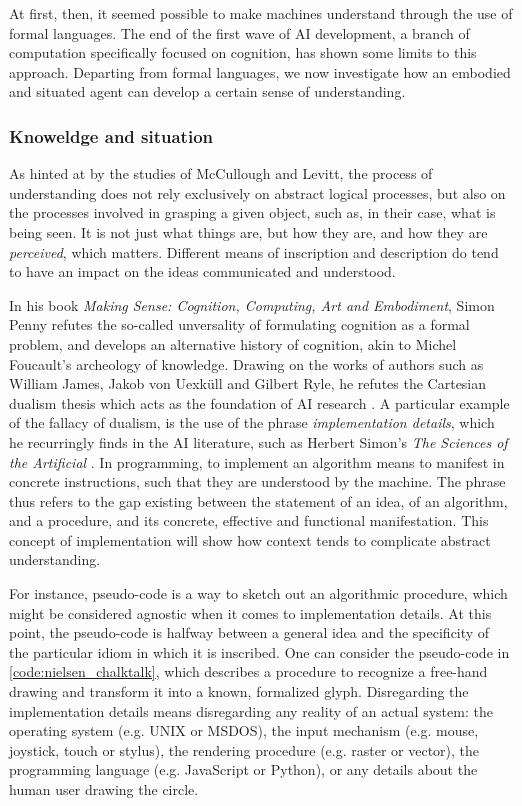 At first, then, it seemed possible to make machines understand through the use of formal languages. The end of the first wave of AI development, a branch of computation specifically focused on cognition, has shown some limits to this approach. Departing from formal languages, we now investigate how an embodied and situated agent can develop a certain sense of understanding.

\subsubsection{Knoweldge and situation}
\label{subsubsec:knowledge-situation}

As hinted at by the studies of McCullough and Levitt, the process of understanding does not rely exclusively on abstract logical processes, but also on the processes involved in grasping a given object, such as, in their case, what is being seen. It is not just what things are, but how they are, and how they are \emph{perceived}, which matters. Different means of inscription and description do tend to have an impact on the ideas communicated and understood.

In his book \emph{Making Sense: Cognition, Computing, Art and Embodiment}, Simon Penny refutes the so-called unversality of formulating cognition as a formal problem, and develops an alternative history of cognition, akin to Michel Foucault's archeology of knowledge. Drawing on the works of authors such as William James, Jakob von Uexküll and Gilbert Ryle, he refutes the Cartesian dualism thesis which acts as the foundation of AI research \citep{penny_making_2019}. A particular example of the fallacy of dualism, is the use of the phrase \emph{implementation details}, which he recurringly finds in the AI literature, such as Herbert Simon's \emph{The Sciences of the Artificial} \citep{simon_sciences_1996}. In programming, to implement an algorithm means to manifest in concrete instructions, such that they are understood by the machine. The phrase thus refers to the gap existing between the statement of an idea, of an algorithm, and a procedure, and its concrete, effective and functional manifestation. This concept of implementation will show how context tends to complicate abstract understanding.

For instance, pseudo-code is a way to sketch out an algorithmic procedure, which might be considered agnostic when it comes to implementation details. At this point, the pseudo-code is halfway between a general idea and the specificity of the particular idiom in which it is inscribed. One can consider the pseudo-code in \ref{code:nielsen_chalktalk}, which describes a procedure to recognize a free-hand drawing and transform it into a known, formalized glyph. Disregarding the implementation details means disregarding any reality of an actual system: the operating system (e.g. UNIX or MSDOS), the input mechanism (e.g. mouse, joystick, touch or stylus), the rendering procedure (e.g. raster or vector), the programming language (e.g. JavaScript or Python), or any details about the human user drawing the circle.

